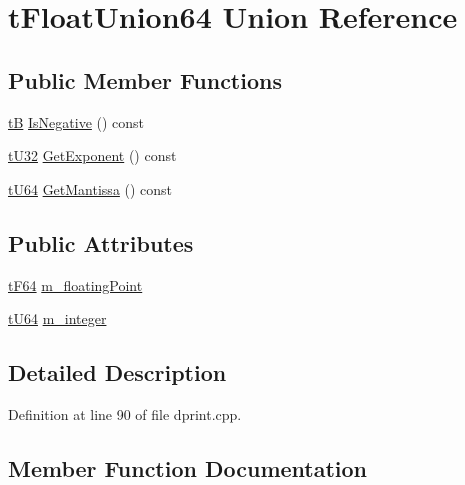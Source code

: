 \hypertarget{uniontFloatUnion64}{}\section{t\+Float\+Union64 Union Reference}
\label{uniontFloatUnion64}
\subsection*{Public Member Functions}
\begin{DoxyCompactItemize}
\item 
\hyperlink{dstandard_8h_ad203aed3ab57b120eb54c2043f60dc49}{tB} \hyperlink{uniontFloatUnion64_acef6b9abed06d568b90ed31592e13242}{Is\+Negative} () const 
\item 
\hyperlink{dstandard_8h_aee96db7e18784e05ed6b0bcaeec3f7f6}{t\+U32} \hyperlink{uniontFloatUnion64_a9a52499d5e9a41152da0368522121dd9}{Get\+Exponent} () const 
\item 
\hyperlink{dstandard_8h_a6625ae5505b2f796350b82c7f52fcf43}{t\+U64} \hyperlink{uniontFloatUnion64_ac19d91a8d0950d68fb2610925e2fe43e}{Get\+Mantissa} () const 
\end{DoxyCompactItemize}
\subsection*{Public Attributes}
\begin{DoxyCompactItemize}
\item 
\hyperlink{dstandard_8h_a401388ecc207be71d44743e3b4cc4b4d}{t\+F64} \hyperlink{uniontFloatUnion64_aac8887130a7750b7ed3e38d2172e0d4d}{m\+\_\+floating\+Point}
\item 
\hyperlink{dstandard_8h_a6625ae5505b2f796350b82c7f52fcf43}{t\+U64} \hyperlink{uniontFloatUnion64_a7579348287571c05c408cda342217d91}{m\+\_\+integer}
\end{DoxyCompactItemize}


\subsection{Detailed Description}


Definition at line 90 of file dprint.\+cpp.



\subsection{Member Function Documentation}
